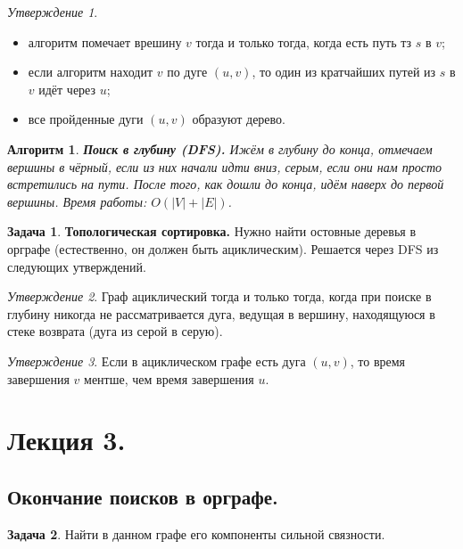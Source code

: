 \documentclass[a4paper]{article}
\theoremstyle{indented}
\newtheorem{alg}{Алгоритм}
\theoremstyle{definition}
\newtheorem{prob}{Задача}
\theoremstyle{remark}
\newtheorem{stat}{Утверждение}
\begin{document}
\begin{stat} \ 
    \begin{itemize}
        \item алгоритм помечает врешину $v$ тогда и только тогда, когда есть путь тз $s$ в $v$; 
        \item если алгоритм находит $v$ по дуге $(u, v)$, то один из кратчайших путей из $s$ в $v$ идёт через $u$; 
        \item все пройденные дуги $(u, v)$ образуют дерево.
    \end{itemize}
\end{stat}

\begin{alg}
    \textbf{Поиск в глубину (DFS).} Ижём в глубину до конца, отмечаем вершины в чёрный, если из них начали идти вниз, серым, если они нам просто встретились на пути. После того, как дошли до конца, идём наверх до первой вершины. Время работы: $O(|V|+|E|)$. 
\end{alg}

\begin{prob}
    \textbf{Топологическая сортировка.} Нужно найти остовные деревья в орграфе (естественно, он должен быть ациклическим). Решается через DFS из следующих утверждений. 
\end{prob}

\begin{stat}
    Граф ациклический тогда и только тогда, когда при поиске в глубину никогда не рассматривается дуга, ведущая в вершину, находящуюся в стеке возврата (дуга из серой в серую).
\end{stat}

\begin{stat}
    Если в ациклическом графе есть дуга $(u, v)$, то время завершения $v$ ментше, чем время завершения $u$. 
\end{stat}

\section{Лекция 3.}

\subsection{Окончание поисков в орграфе.}

\begin{prob}
    Найти в данном графе его компоненты сильной связности. 
\end{prob}
\end{document}
